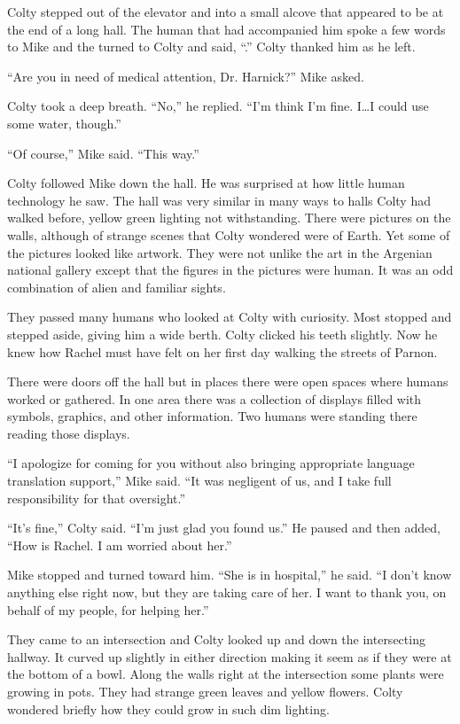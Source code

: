 \breakpoint

Colty stepped out of the elevator and into a small alcove that appeared to be at the end of a
long hall. The human that had accompanied him spoke a few words to Mike and the turned to Colty
and said, ``.'' Colty thanked him as he left.

``Are you in need of medical attention, Dr. Harnick?'' Mike asked.

Colty took a deep breath. ``No,'' he replied. ``I'm think I'm fine. I\ldots I could use some
water, though.''

``Of course,'' Mike said. ``This way.''

Colty followed Mike down the hall. He was surprised at how little human technology he saw. The
hall was very similar in many ways to halls Colty had walked before, yellow green lighting not
withstanding. There were pictures on the walls, although of strange scenes that Colty wondered
were of Earth. Yet some of the pictures looked like artwork. They were not unlike the art in the
Argenian national gallery except that the figures in the pictures were human. It was an odd
combination of alien and familiar sights.

They passed many humans who looked at Colty with curiosity. Most stopped and stepped aside,
giving him a wide berth. Colty clicked his teeth slightly. Now he knew how Rachel must have
felt on her first day walking the streets of Parnon.

There were doors off the hall but in places there were open spaces where humans worked or
gathered. In one area there was a collection of displays filled with symbols, graphics, and
other information. Two humans were standing there reading those displays.

``I apologize for coming for you without also bringing appropriate language translation
support,'' Mike said. ``It was negligent of us, and I take full responsibility for that
oversight.''

``It's fine,'' Colty said. ``I'm just glad you found us.'' He paused and then added, ``How is
Rachel. I am worried about her.''

Mike stopped and turned toward him. ``She is in hospital,'' he said. ``I don't know anything
else right now, but they are taking care of her. I want to thank you, on behalf of my people,
for helping her.''

They came to an intersection and Colty looked up and down the intersecting hallway. It curved up
slightly in either direction making it seem as if they were at the bottom of a bowl. Along the
walls right at the intersection some plants were growing in pots. They had strange green leaves
and yellow flowers. Colty wondered briefly how they could grow in such dim lighting.

